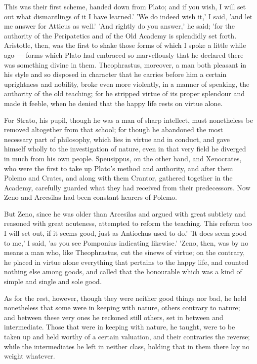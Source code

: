  This was their first scheme, handed down from Plato; and if you wish, I will set out what dismantlings of it I have learned.' 'We do indeed wish it,' I said, 'and let me answer for Atticus as well.' 'And rightly do you answer,' he said; 'for the authority of the Peripatetics and of the Old Academy is splendidly set forth. Aristotle, then, was the first to shake those forms of which I spoke a little while ago — forms which Plato had embraced so marvellously that he declared there was something divine in them. Theophrastus, moreover, a man both pleasant in his style and so disposed in character that he carries before him a certain uprightness and nobility, broke even more violently, in a manner of speaking, the authority of the old teaching; for he stripped virtue of its proper splendour and made it feeble, when he denied that the happy life rests on virtue alone.

 For Strato, his pupil, though he was a man of sharp intellect, must nonetheless be removed altogether from that school; for though he abandoned the most necessary part of philosophy, which lies in virtue and in conduct, and gave himself wholly to the investigation of nature, even in that very field he diverged in much from his own people. Speusippus, on the other hand, and Xenocrates, who were the first to take up Plato's method and authority, and after them Polemo and Crates, and along with them Crantor, gathered together in the Academy, carefully guarded what they had received from their predecessors. Now Zeno and Arcesilas had been constant hearers of Polemo.

 But Zeno, since he was older than Arcesilas and argued with great subtlety and reasoned with great acuteness, attempted to reform the teaching. This reform too I will set out, if it seems good, just as Antiochus used to do.' 'It does seem good to me,' I said, 'as you see Pomponius indicating likewise.' 'Zeno, then, was by no means a man who, like Theophrastus, cut the sinews of virtue; on the contrary, he placed in virtue alone everything that pertains to the happy life, and counted nothing else among goods, and called that the honourable which was a kind of simple and single and sole good.

 As for the rest, however, though they were neither good things nor bad, he held nonetheless that some were in keeping with nature, others contrary to nature; and between these very ones he reckoned still others, set in between and intermediate. Those that were in keeping with nature, he taught, were to be taken up and held worthy of a certain valuation, and their contraries the reverse; while the intermediates he left in neither class, holding that in them there lay no weight whatever.

